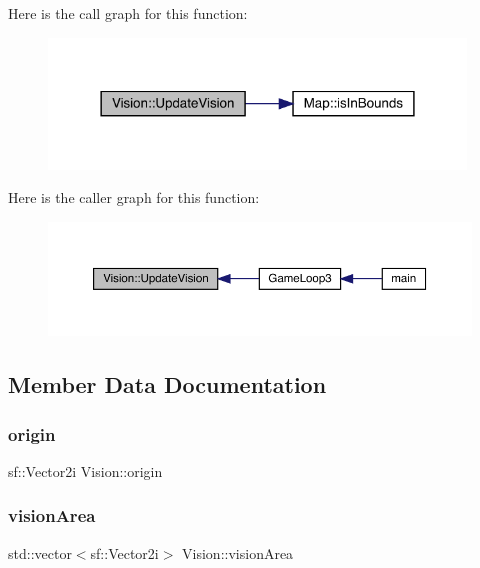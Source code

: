 Here is the call graph for this function\+:
\nopagebreak
\begin{figure}[H]
\begin{center}
\leavevmode
\includegraphics[width=314pt]{da/d76/class_vision_a626452b58aa651ff91e4e60a74ce7443_cgraph}
\end{center}
\end{figure}
Here is the caller graph for this function\+:
\nopagebreak
\begin{figure}[H]
\begin{center}
\leavevmode
\includegraphics[width=350pt]{da/d76/class_vision_a626452b58aa651ff91e4e60a74ce7443_icgraph}
\end{center}
\end{figure}


\subsection{Member Data Documentation}
\mbox{\label{class_vision_ab68e6f7a554cda7c398168ca150dd4c0}} 
\subsubsection{\texorpdfstring{origin}{origin}}
{\footnotesize\ttfamily sf\+::\+Vector2i Vision\+::origin\hspace{0.3cm}{\ttfamily [private]}}

\mbox{\label{class_vision_a04430228cfbaaa15871d28a68ad7e1b1}} 
\subsubsection{\texorpdfstring{vision\+Area}{visionArea}}
{\footnotesize\ttfamily std\+::vector$<$sf\+::\+Vector2i$>$ Vision\+::vision\+Area\hspace{0.3cm}{\ttfamily [private]}}



